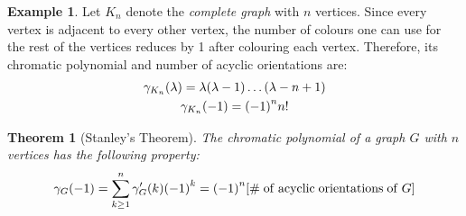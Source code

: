 \documentclass[svgnames]{article}
\newtheorem{Theorem}{Theorem}
\theoremstyle{definition}
\newtheorem*{Example*}{Example}
\theoremstyle{remark}
\theoremstyle{underline}
\theoremstyle{underline}
\begin{document}
	\begin{Example*}
		Let $K_n$ denote the \emph{complete graph} with $n$ vertices. Since every vertex is adjacent to every other vertex, the number of colours one can use for the rest of the vertices reduces by 1 after colouring each vertex. Therefore, its chromatic polynomial and number of acyclic orientations are:
		\begin{gather*}
			\gamma_{K_n}\pqty{\lambda} = \lambda\pqty{\lambda - 1}\dots\pqty{\lambda - n + 1} \\
			\gamma_{K_n}\pqty{-1} = \pqty{-1}^n n!
		\end{gather*} 
	\end{Example*}
	\begin{Theorem}[Stanley's Theorem]
		The chromatic polynomial of a graph $G$ with $n$ vertices has the following property:
		\begin{gather*}
			\gamma_{G}\pqty{-1} = \sum_{k \geq 1}^n \gamma'_G(k) \pqty{-1}^k = \pqty{-1}^n \bqty{\mathrm{\#\;of\;acyclic \;orientations\;of\;} G}
		\end{gather*}
	\end{Theorem}
\end{document}
